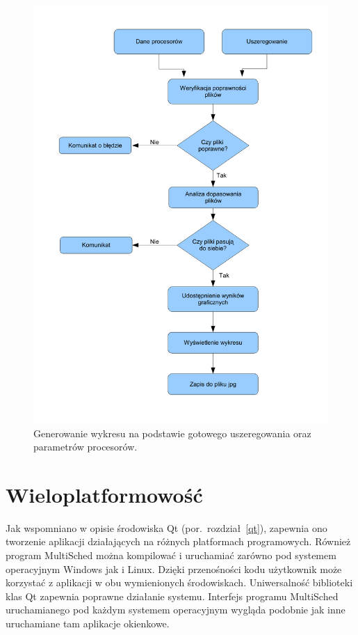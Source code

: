 \begin{itemize}
		\begin{figure}[p]
        \centering\includegraphics[scale=0.55]{figures/schemat2.pdf}
		\caption{Generowanie wykresu na podstawie gotowego uszeregowania oraz parametrów procesorów.}\label{rys:schemat2}
		\end{figure}
\end{itemize}
\afterpage{\clearpage}

\section{Wieloplatformowość}

Jak wspomniano w opisie środowiska Qt (por.~rozdział~\ref{qt}), zapewnia ono tworzenie aplikacji działających na różnych platformach programowych. Również 
program MultiSched 
można kompilować i uruchamiać zarówno pod systemem operacyjnym Windows jak i Linux. Dzięki przenośności kodu użytkownik może korzystać z aplikacji 
 w obu wymienionych środowiskach. Uniwersalność biblioteki klas Qt zapewnia poprawne działanie systemu. Interfejs programu MultiSched uruchamianego 
pod każdym systemem operacyjnym wygląda podobnie jak inne uruchamiane tam aplikacje okienkowe.

